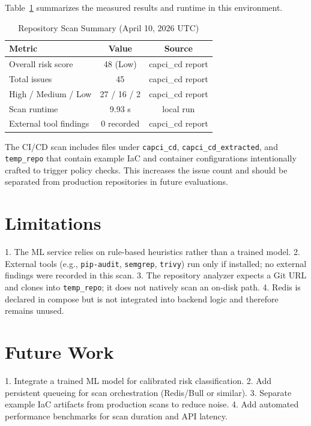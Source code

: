 \documentclass[conference]{IEEEtran}
\begin{document}
Table~\ref{tab:eval} summarizes the measured results and runtime in this environment.

\begin{table}[htbp]
\centering
\caption{Repository Scan Summary (April 10, 2026 UTC)}
\label{tab:eval}
\begin{tabular}{lcc}
\toprule
\textbf{Metric} & \textbf{Value} & \textbf{Source} \\
\midrule
Overall risk score & 48 (Low) & capci\_cd report \\
Total issues & 45 & capci\_cd report \\
High / Medium / Low & 27 / 16 / 2 & capci\_cd report \\
Scan runtime & 9.93 s & local run \\
External tool findings & 0 recorded & capci\_cd report \\
\bottomrule
\end{tabular}
\end{table}

The CI/CD scan includes files under \texttt{capci\_cd}, \texttt{capci\_cd\_extracted}, and \texttt{temp\_repo} that contain example IaC and container configurations intentionally crafted to trigger policy checks. This increases the issue count and should be separated from production repositories in future evaluations.

\section{Limitations}
1. The ML service relies on rule-based heuristics rather than a trained model.
2. External tools (e.g., \texttt{pip-audit}, \texttt{semgrep}, \texttt{trivy}) run only if installed; no external findings were recorded in this scan.
3. The repository analyzer expects a Git URL and clones into \texttt{temp\_repo}; it does not natively scan an on-disk path.
4. Redis is declared in compose but is not integrated into backend logic and therefore remains unused.

\section{Future Work}
1. Integrate a trained ML model for calibrated risk classification.
2. Add persistent queueing for scan orchestration (Redis/Bull or similar).
3. Separate example IaC artifacts from production scans to reduce noise.
4. Add automated performance benchmarks for scan duration and API latency.
\end{document}
